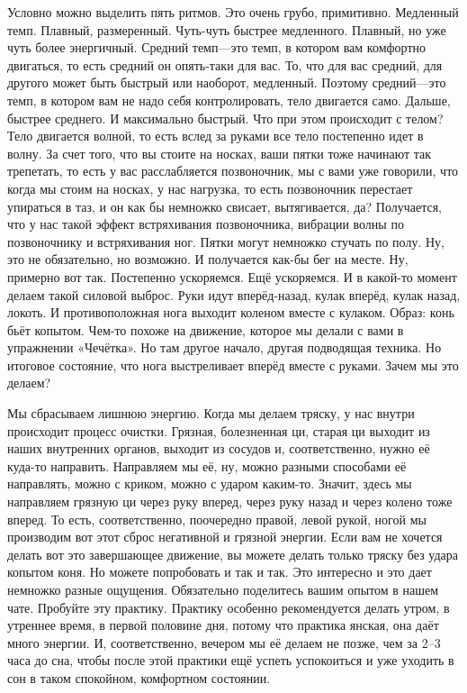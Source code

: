 Условно можно выделить пять ритмов. Это очень грубо, примитивно. Медленный
темп. Плавный, размеренный. Чуть-чуть быстрее медленного. Плавный, но уже чуть более
энергичный. Средний темп---это темп, в котором вам комфортно двигаться, то есть средний он
опять-таки для вас. То, что для вас средний, для другого может быть быстрый или наоборот,
медленный. Поэтому средний---это темп, в котором вам не надо себя контролировать, тело
двигается само. Дальше, быстрее среднего. И максимально быстрый. Что при этом происходит с
телом? Тело двигается волной, то есть вслед за руками все тело постепенно идет в волну. За счет
того, что вы стоите на носках, ваши пятки тоже начинают так трепетать, то есть у вас
расслабляется позвоночник, мы с вами уже говорили, что когда мы стоим на носках, у нас
нагрузка, то есть позвоночник перестает упираться в таз, и он как бы немножко свисает,
вытягивается, да? Получается, что у нас такой эффект встряхивания позвоночника, вибрации волны
по позвоночнику и встряхивания ног. Пятки могут немножко стучать по полу. Ну, это не
обязательно, но возможно. И получается как-бы бег на месте. Ну, примерно вот так. Постепенно
ускоряемся. Ещё ускоряемся. И в какой-то момент делаем такой силовой выброс. Руки идут
вперёд-назад, кулак вперёд,
кулак назад, локоть. И противоположная нога выходит коленом вместе с кулаком. Образ: конь бьёт
копытом. Чем-то похоже на движение, которое мы делали с вами в упражнении «Чечётка». Но там другое
начало, другая подводящая техника. Но итоговое состояние, что нога выстреливает вперёд вместе с
руками. Зачем мы это делаем?

Мы сбрасываем лишнюю энергию. Когда мы делаем тряску, у нас внутри
происходит процесс очистки. Грязная, болезненная ци, старая ци выходит из наших внутренних
органов, выходит из сосудов и, соответственно, нужно её куда-то направить. Направляем мы её,
ну, можно разными способами её направлять, можно с криком, можно с ударом каким-то. Значит,
здесь мы направляем грязную ци через руку вперед, через руку назад и через колено тоже вперед.
То есть, соответственно, поочередно правой, левой рукой, ногой мы производим вот этот сброс
негативной и грязной энергии. Если вам не хочется делать вот это завершающее движение, вы
можете делать только тряску без удара копытом коня. Но можете попробовать и так и так.
Это
интересно и это дает немножко разные ощущения. Обязательно поделитесь вашим опытом в нашем
чате. Пробуйте эту практику. Практику особенно рекомендуется делать утром, в утреннее время, в
первой половине дня, потому что практика янская, она даёт много энергии. И, соответственно,
вечером мы её делаем не позже, чем за 2--3 часа до сна, чтобы после этой практики ещё успеть
успокоиться и уже уходить в сон в таком спокойном, комфортном состоянии.

